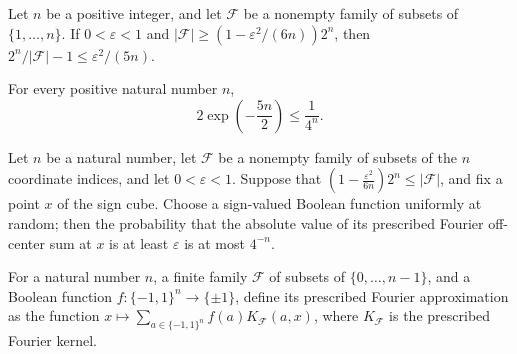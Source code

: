\begin{theorem}
\label{FABL.prescribedFourierOffCenterVariance_le}
\leanok
{}
Let $n$ be a positive integer, and let $\mathcal F$ be a nonempty family of subsets of
$\{1,\ldots,n\}$. If $0<\varepsilon<1$ and $|\mathcal F|\ge (1-\varepsilon^2/(6n))2^n$,
then $2^n/|\mathcal F|-1\le \varepsilon^2/(5n)$.
\end{theorem}

\begin{theorem}
\label{FABL.two_mul_exp_neg_five_halves_mul_le_four_pow_inv}
\leanok
{}
For every positive natural number $n$,
\[2\exp\!\left(-\frac{5n}{2}\right)\leq\frac{1}{4^n}.\]
\end{theorem}

\begin{theorem}
\label{FABL.measure_prescribedFourierOffCenterSum_abs_ge_le}
\leanok
{}
Let $n$ be a natural number, let $\mathcal F$ be a nonempty family of subsets of the $n$
coordinate indices, and let $0<\varepsilon<1$. Suppose that
$\left(1-\frac{\varepsilon^2}{6n}\right)2^n\le |\mathcal F|$, and fix a point $x$ of the
sign cube. Choose a sign-valued Boolean function uniformly at random; then the
probability that the absolute value of its prescribed Fourier off-center sum at $x$ is
at least $\varepsilon$ is at most $4^{-n}$.
\end{theorem}

\begin{definition}
\label{FABL.prescribedFourierApproximation}
\leanok
{}
For a natural number $n$, a finite family $\mathcal F$ of subsets of $\{0,\ldots,n-1\}$,
and a Boolean function $f:\{-1,1\}^n\to\{\pm1\}$, define its prescribed Fourier
approximation as the function $x\mapsto\sum_{a\in\{-1,1\}^n} f(a)K_{\mathcal F}(a,x)$,
where $K_{\mathcal F}$ is the prescribed Fourier kernel.
\end{definition}

